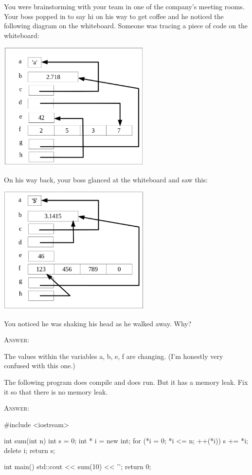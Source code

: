 \newpage
\nextq
You were brainstorming with your team in one of the company's meeting rooms.
Your boss popped in to say hi on his way to get coffee and
he noticed the following diagram on the whiteboard.
Someone was tracing a piece of code on the whiteboard:
\begin{center}
  \includegraphics[width=3in]{pic1.PNG}
\end{center}
On his way back, your boss glanced at the whiteboard and saw this:
\begin{center}
  \includegraphics[width=3in]{pic2.PNG}
\end{center}
You noticed he was shaking his head as he walked away. Why?

\textsc{Answer:}
\begin{answercode}
The values within the variables a, b, e, f are changing.
(I'm honestly very confused with this one.)
\end{answercode}

\newpage
\nextq
The following program does compile and does run. But it has a memory leak.
Fix it so that there is no memory leak.

\textsc{Answer:}
\begin{answercode}
#include <iostream>

int sum(int n)
{
    int s = 0;
    int * i = new int;
    for (*i = 0; *i <= n; ++(*i))
    {
        s += *i;
    }
    delete i;
    return s;
}

int main()
{
    std::cout << sum(10) << '\n';
    return 0;
}
\end{answercode}


